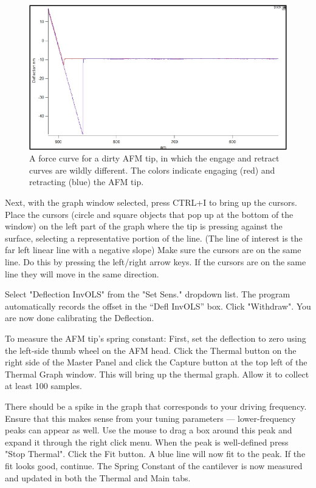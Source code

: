 \documentclass{beavtex_dub_edit}
\begin{document}
\begin{figure}
    \includegraphics[width = 1\textwidth]{force curve.pdf}
    \caption{A force curve for a dirty AFM tip, in which the engage and retract curves are wildly different. The colors indicate engaging (red) and retracting (blue) the AFM tip.}
    \label{force curve}
\end{figure}

Next, with the graph window selected, press CTRL+I to bring up the cursors. Place the cursors (circle and square objects that pop up at the bottom of the window) on the left part of the graph where the tip is pressing against the surface, selecting a representative portion of the line. (The line of interest is the far left linear line with a negative slope) Make sure the cursors are on the same line. Do this by pressing the left/right arrow keys. If the cursors are on the same line they will move in the same direction.

Select "Deflection InvOLS" from the "Set Sens." dropdown list. The program automatically records the offset in the “Defl InvOLS” box. Click "Withdraw". You are now done calibrating the Deflection.
   
To measure the AFM tip's spring constant: First, set the deflection to zero using the left-side thumb wheel on the AFM head. Click the Thermal button on the right side of the Master Panel and click the Capture button at the top left of the Thermal Graph window. This will bring up the thermal graph. Allow it to collect at least 100 samples.

There should be a spike in the graph that corresponds to your driving frequency. Ensure that this makes sense from your tuning parameters — lower-frequency peaks can appear as well. Use the mouse to drag a box around this peak and expand it through the right click menu. When the peak is well-defined press "Stop Thermal". Click the Fit button. A blue line will now fit to the peak. If the fit looks good, continue. The Spring Constant of the cantilever is now measured and updated in both the Thermal and Main tabs.
\end{document}
